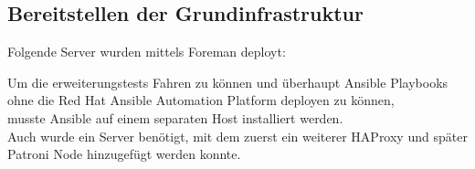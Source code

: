 
\begin{flushleft}
    \subsection{Bereitstellen der Grundinfrastruktur}
    Folgende Server wurden mittels \Gls{Foreman} deployt:
    
\end{flushleft}
\begin{flushleft}
    Um die erweiterungstests Fahren zu können und überhaupt \Gls{Ansible} Playbooks ohne die \Gls{Red Hat Ansible Automation Platform} deployen zu können,\\
    musste \Gls{Ansible} auf einem separaten Host installiert werden.\\
    Auch wurde ein Server benötigt, mit dem zuerst ein weiterer \Gls{HAProxy} und später Patroni Node hinzugefügt werden konnte.
    
\end{flushleft}